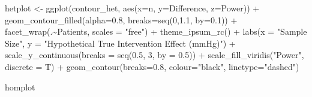 \documentclass[
]{article}
\newenvironment{Shaded}{\begin{snugshade}}{\end{snugshade}}
\newcommand{\AttributeTok}[1]{\textcolor[rgb]{0.77,0.63,0.00}{#1}}
\newcommand{\DecValTok}[1]{\textcolor[rgb]{0.00,0.00,0.81}{#1}}
\newcommand{\FloatTok}[1]{\textcolor[rgb]{0.00,0.00,0.81}{#1}}
\newcommand{\FunctionTok}[1]{\textcolor[rgb]{0.00,0.00,0.00}{#1}}
\newcommand{\NormalTok}[1]{#1}
\newcommand{\OtherTok}[1]{\textcolor[rgb]{0.56,0.35,0.01}{#1}}
\newcommand{\SpecialCharTok}[1]{\textcolor[rgb]{0.00,0.00,0.00}{#1}}
\newcommand{\StringTok}[1]{\textcolor[rgb]{0.31,0.60,0.02}{#1}}
\begin{document}
\begin{Shaded}
\begin{Highlighting}[]
\NormalTok{hetplot }\OtherTok{\textless{}{-}} \FunctionTok{ggplot}\NormalTok{(contour\_het, }\FunctionTok{aes}\NormalTok{(}\AttributeTok{x=}\NormalTok{n, }\AttributeTok{y=}\NormalTok{Difference, }\AttributeTok{z=}\NormalTok{Power)) }\SpecialCharTok{+}
  \FunctionTok{geom\_contour\_filled}\NormalTok{(}\AttributeTok{alpha=}\FloatTok{0.8}\NormalTok{, }\AttributeTok{breaks=}\FunctionTok{seq}\NormalTok{(}\DecValTok{0}\NormalTok{,}\FloatTok{1.1}\NormalTok{, }\AttributeTok{by=}\FloatTok{0.1}\NormalTok{)) }\SpecialCharTok{+}
  \FunctionTok{facet\_wrap}\NormalTok{(.}\SpecialCharTok{\textasciitilde{}}\NormalTok{Patients, }\AttributeTok{scales =} \StringTok{"free"}\NormalTok{) }\SpecialCharTok{+}
  \FunctionTok{theme\_ipsum\_rc}\NormalTok{() }\SpecialCharTok{+}
  \FunctionTok{labs}\NormalTok{(}\AttributeTok{x =} \StringTok{"Sample Size"}\NormalTok{,}
       \AttributeTok{y =} \StringTok{"Hypothetical True Intervention Effect (mmHg)"}\NormalTok{) }\SpecialCharTok{+}
  \FunctionTok{scale\_y\_continuous}\NormalTok{(}\AttributeTok{breaks =} \FunctionTok{seq}\NormalTok{(}\FloatTok{0.5}\NormalTok{, }\DecValTok{3}\NormalTok{, }\AttributeTok{by =} \FloatTok{0.5}\NormalTok{)) }\SpecialCharTok{+}
  \FunctionTok{scale\_fill\_viridis}\NormalTok{(}\StringTok{"Power"}\NormalTok{, }\AttributeTok{discrete =}\NormalTok{ T) }\SpecialCharTok{+}
  \FunctionTok{geom\_contour}\NormalTok{(}\AttributeTok{breaks=}\FloatTok{0.8}\NormalTok{, }\AttributeTok{colour=}\StringTok{"black"}\NormalTok{, }\AttributeTok{linetype=}\StringTok{"dashed"}\NormalTok{)}

\NormalTok{homplot}
\end{Highlighting}
\end{Shaded}
\end{document}
